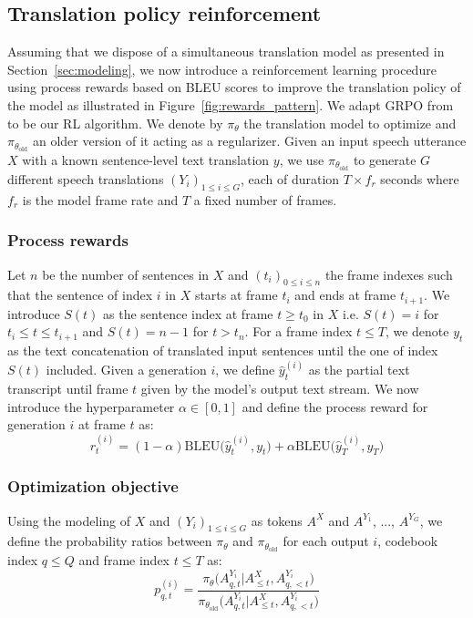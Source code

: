 \subsection{Translation policy reinforcement}
\label{sec:rl_method}
Assuming that we dispose of a simultaneous translation model as presented in Section~\ref{sec:modeling}, we now introduce a reinforcement learning procedure using process rewards based on BLEU scores to improve the translation policy of the model as illustrated in Figure~\ref{fig:rewards_pattern}. We adapt GRPO from \citet{grpo} to be our RL algorithm. We denote by $\pi_{\theta}$ the translation model to optimize and $\pi_{\theta_{\mathrm{old}}}$ an older version of it acting as a regularizer. Given an input speech utterance $X$ with a known sentence-level text translation $y$, we use $\pi_{\theta_{\mathrm{old}}}$ to generate $G$ different speech translations $(Y_i)_{1 \le i \le G}$, each of duration $T \times f_r$ seconds where $f_r$ is the model frame rate and $T$ a fixed number of frames.

\subsubsection{Process rewards}
\label{sec:process_rewards}

Let $n$ be the number of sentences in $X$ and $(t_i)_{0 \le i \le n}$ the frame indexes such that the sentence of index $i$ in $X$ starts at frame $t_i$ and ends at frame $t_{i+1}$. We introduce $S(t)$ as the sentence index at frame $t \ge t_0$ in $X$ i.e. $S(t)=i$ for $t_i \le t \le t_{i+1}$ and $S(t)=n-1$ for $t > t_n$. For a frame index $t \le T$, we denote $y_t$ as the text concatenation of translated input sentences until the one of index $S(t)$ included. Given a generation $i$, we define $\hat{y}^{(i)}_{t}$ as the partial text transcript until frame $t$ given by the model's output text stream. We now introduce the hyperparameter $\alpha \in [0,1]$ and define the process reward for generation $i$ at frame $t$ as:
\begin{equation}
\label{eq:process_reward}
    r^{(i)}_{t} = (1 - \alpha) \mathrm{BLEU} \big( \hat{y}^{(i)}_{t}, y_{t} \big) + \alpha \mathrm{BLEU} \big( \hat{y}^{(i)}_{T}, y_{T} \big)
\end{equation}

\subsubsection{Optimization objective}
\label{sec:optim_objective}
Using the modeling of $X$ and $(Y_i)_{1 \le i \le G}$ as tokens $A^X$ and $A^{Y_{1}}$, ..., $A^{Y_{G}}$, we define the probability ratios between $\pi_{\theta}$ and $\pi_{\theta_{\mathrm{old}}}$ for each output $i$, codebook index $q \le Q$ and frame index $t \le T$ as:
\begin{equation}
\label{eq:log_prob}
    p^{(i)}_{q,t} = \frac{\pi_{\theta} \Big( A^{Y_{i}}_{q,t}|A^X_{\le t},A^{Y_{i}}_{q,<t} \Big) }{\pi_{\theta_{\mathrm{old}}} \Big( A^{Y_{i}}_{q,t}|A^X_{\le t},A^{Y_{i}}_{q,<t} \Big) }
\end{equation}

